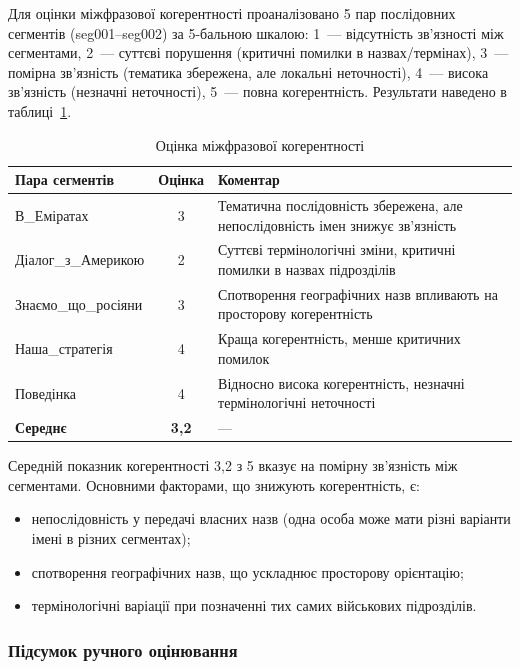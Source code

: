 Для оцінки міжфразової когерентності проаналізовано 5 пар послідовних
сегментів (seg001--seg002) за 5-бальною шкалою: 1~--- відсутність
зв'язності між сегментами, 2~--- суттєві порушення (критичні помилки
в назвах/термінах), 3~--- помірна зв'язність (тематика збережена, але
локальні неточності), 4~--- висока зв'язність (незначні неточності),
5~--- повна когерентність. Результати наведено в таблиці~\ref{tab:coherence}.

\begin{table}[h]
\centering
\caption{Оцінка міжфразової когерентності}
\label{tab:coherence}
\begin{tabular}{|l|c|p{6cm}|}
\hline
\textbf{Пара сегментів} & \textbf{Оцінка} & \textbf{Коментар} \\
\hline
В\_Еміратах & 3 & Тематична послідовність збережена, але непослідовність імен знижує зв'язність \\
\hline
Діалог\_з\_Америкою & 2 & Суттєві термінологічні зміни, критичні помилки в назвах підрозділів \\
\hline
Знаємо\_що\_росіяни & 3 & Спотворення географічних назв впливають на просторову когерентність \\
\hline
Наша\_стратегія & 4 & Краща когерентність, менше критичних помилок \\
\hline
Поведінка & 4 & Відносно висока когерентність, незначні термінологічні неточності \\
\hline
\textbf{Середнє} & \textbf{3,2} & --- \\
\hline
\end{tabular}
\end{table}

Середній показник когерентності 3,2 з 5 вказує на помірну зв'язність між
сегментами. Основними факторами, що знижують когерентність, є:
\begin{itemize}[nosep]
    \item непослідовність у передачі власних назв (одна особа може мати різні
    варіанти імені в різних сегментах);
    \item спотворення географічних назв, що ускладнює просторову орієнтацію;
    \item термінологічні варіації при позначенні тих самих військових підрозділів.
\end{itemize}

\subsubsection{Підсумок ручного оцінювання}

